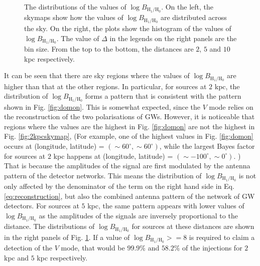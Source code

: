 \documentclass[aps,twocolumn,showpacs,groupedaddress, nofootinbib]{revtex4}  %
\begin{document}
\begin{figure}
\begin{center}
{        }\quad
    \end{center}
    \caption{The distributions of the values of $\log B_{\text{H}_1 / \text{H}_0}$.
    On the left, the skymaps show how the values of $\log B_{\text{H}_1 / \text{H}_0}$ are distributed across the sky.
    On the right, the plots show the histogram of the values of $\log B_{\text{H}_1 / \text{H}_0}$.
    The value of $\Delta$ in the legends on the right panels are the bin size. 
    From the top to the bottom, the distances are $2$, $5$ and $10$ kpc respectively.
    \label{fig:simulationresults}} 
\end{figure}
It can be seen that there are sky regions where the values of $\log B_{\text{H}_1 / \text{H}_0}$ 
are higher than that at the other regions.
In particular, for sources at $2$ kpc, the distribution of  $\log B_{\text{H}_1 / \text{H}_0}$ forms a pattern that 
is consistent with the pattern shown in Fig. \ref{fig:domon}. This is somewhat expected, 
since the $V$ mode relies on the reconstruction of the two polarisations of \acp{GW}.
However, it is noticeable that regions where the values are the highest in Fig. \ref{fig:domon} are not the highest in Fig. \ref{fig:2kpcskymap},
(For example, one of the highest values in Fig. \ref{fig:domon} occurs at (longitude, latitude) = $(\sim 60^\circ, \sim 60^\circ)$, while the largest Bayes factor
for sources at $2$ kpc happens at (longitude, latitude) = $(\sim -100^\circ, \sim 0^\circ)$. )
That is because the amplitudes of the signal are first modulated by the antenna pattern of the detector networks.
This means the distribution of $\log B_{\text{H}_1 / \text{H}_0}$ 
is not only affected by the denominator of the term on the right hand side in Eq. \ref{eq:reconstruction},
but also the combined antenna pattern of the network of \ac{GW} detectors.
For sources at $5$ kpc, the same pattern appears 
with lower values of $\log B_{\text{H}_1 / \text{H}_0}$ as the amplitudes of the signals are inversely proportional to the distance.
The distributions of $\log B_{\text{H}_1 / \text{H}_0}$ for sources at these distances are shown in the right panels of Fig. \ref{fig:simulationresults}.
If a value of $\log B_{\text{H}_1 / \text{H}_0} >= 8$ is required to claim a detection of the $V$ mode, that would be $99.9\%$ and $58.2\%$ of the injections 
for $2$kpc and $5$ kpc respectively.
\end{document}
